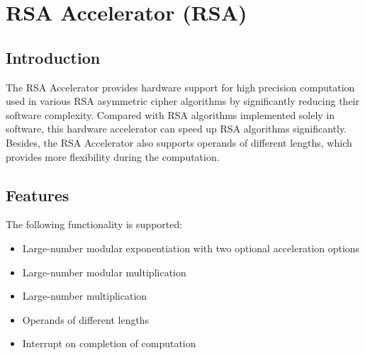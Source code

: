 \documentclass[main\_\_EN.tex]{subfiles}
\begin{document}

\ifglobal
\else
    {\let\clearpage\relax \listoftodos}
    \tableofcontents
\fi



\hypertarget{rsa}{}
\chapter{RSA Accelerator (RSA)}\label{mod:rsa}
\section{Introduction}

The RSA Accelerator provides hardware support for high precision computation used in various RSA asymmetric cipher algorithms by significantly reducing their software complexity. Compared with RSA algorithms implemented solely in software, this hardware accelerator can speed up RSA algorithms significantly. Besides, the RSA Accelerator also supports operands of different lengths, which provides more flexibility during the computation. 
\section{Features}

The following functionality is supported:

\begin{itemize}
    \item Large-number modular exponentiation with two optional acceleration options
    \item Large-number modular multiplication 
    \item Large-number multiplication 
    \item Operands of different lengths
    \item Interrupt on completion of computation 
\end{itemize}
\end{document}
